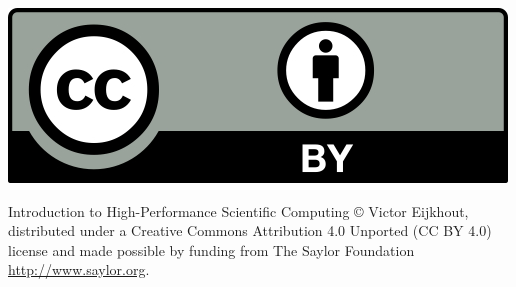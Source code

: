 
\hbox{}\vfill\thispagestyle{empty}

\includegraphics{ccby}

Introduction to High-Performance Scientific Computing \copyright{}
Victor Eijkhout, distributed under a Creative Commons Attribution 4.0
Unported (CC BY 4.0) license and made possible by funding from
The Saylor Foundation \url{http://www.saylor.org}.

\hbox{}\vskip 2in \hbox{}
\pagebreak

